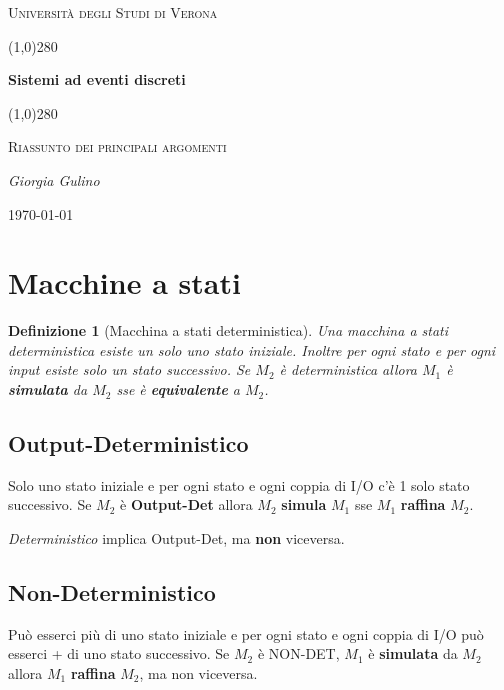 \documentclass[a4paper]{article}
\date{\today}
\newtheorem{definit}{Definizione}[subsection]
\begin{document}
 \clearpage
 \begin{titlepage}
 	\centering
 	\vspace*{\fill}
 	{\scshape\LARGE Università degli Studi di Verona \par}
 	\vspace{1.5cm}
 	\line(1,0){280} \\
 	{\huge\bfseries Sistemi ad eventi discreti\par}
 	\line(1,0){280} \\
 	\vspace{0.5cm}
 	{\scshape\Large Riassunto dei principali argomenti\par}
 	\vspace{2cm}
 	{\Large\itshape Giorgia Gulino\par}
 	\vspace{1cm}

 	\vspace{5cm}
 	\vspace*{\fill}
 	{\large \today\par}
 \end{titlepage}
 \thispagestyle{empty}
\newpage
\tableofcontents
\newpage

\section{Macchine a stati}

\begin{definit}[Macchina a stati deterministica]
Una macchina a stati deterministica esiste un solo uno stato iniziale. Inoltre per ogni stato e per ogni input esiste solo un stato successivo. Se $M_2$ è deterministica allora $M_1$ è \textbf{simulata} da $M_2$ sse è \textbf{equivalente} a $M_2$.
\end{definit}

\subsection{Output-Deterministico}
Solo uno stato iniziale e per ogni stato e ogni coppia di I/O c'è 1 solo stato successivo. Se $M_2$ è \textbf{Output-Det} allora $M_2$ \textbf{simula} $M_1$ sse $M_1$ \textbf{raffina} $M_2$.\\

\begin{center}
\emph{Deterministico} implica Output-Det, ma \textbf{non} viceversa.
\end{center}

\subsection{Non-Deterministico}
Può esserci più di uno stato iniziale e per ogni stato e ogni coppia di I/O può esserci + di uno stato successivo. Se $M_2$ è NON-DET, $M_1$ è \textbf{simulata} da $M_2$ allora $M_1$ \textbf{raffina} $M_2$, ma non viceversa.
\end{document}
